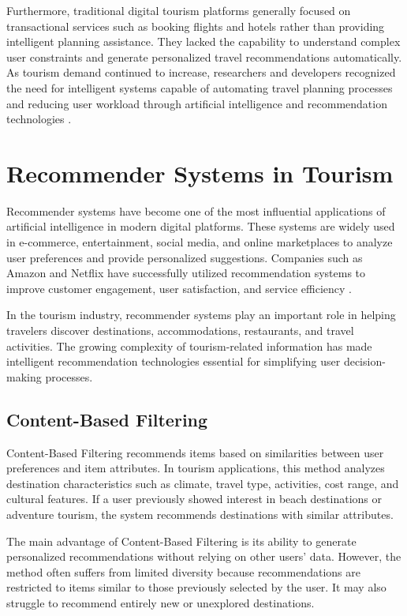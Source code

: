Furthermore, traditional digital tourism platforms generally focused on transactional services such as booking flights and hotels rather than providing intelligent planning assistance. They lacked the capability to understand complex user constraints and generate personalized travel recommendations automatically. As tourism demand continued to increase, researchers and developers recognized the need for intelligent systems capable of automating travel planning processes and reducing user workload through artificial intelligence and recommendation technologies \cite{ricci2015}.

\section{Recommender Systems in Tourism}

Recommender systems have become one of the most influential applications of artificial intelligence in modern digital platforms. These systems are widely used in e-commerce, entertainment, social media, and online marketplaces to analyze user preferences and provide personalized suggestions. Companies such as Amazon and Netflix have successfully utilized recommendation systems to improve customer engagement, user satisfaction, and service efficiency \cite{ricci2015}.

In the tourism industry, recommender systems play an important role in helping travelers discover destinations, accommodations, restaurants, and travel activities. The growing complexity of tourism-related information has made intelligent recommendation technologies essential for simplifying user decision-making processes.

\subsection{Content-Based Filtering}

Content-Based Filtering recommends items based on similarities between user preferences and item attributes. In tourism applications, this method analyzes destination characteristics such as climate, travel type, activities, cost range, and cultural features. If a user previously showed interest in beach destinations or adventure tourism, the system recommends destinations with similar attributes.

The main advantage of Content-Based Filtering is its ability to generate personalized recommendations without relying on other users' data. However, the method often suffers from limited diversity because recommendations are restricted to items similar to those previously selected by the user. It may also struggle to recommend entirely new or unexplored destinations.

